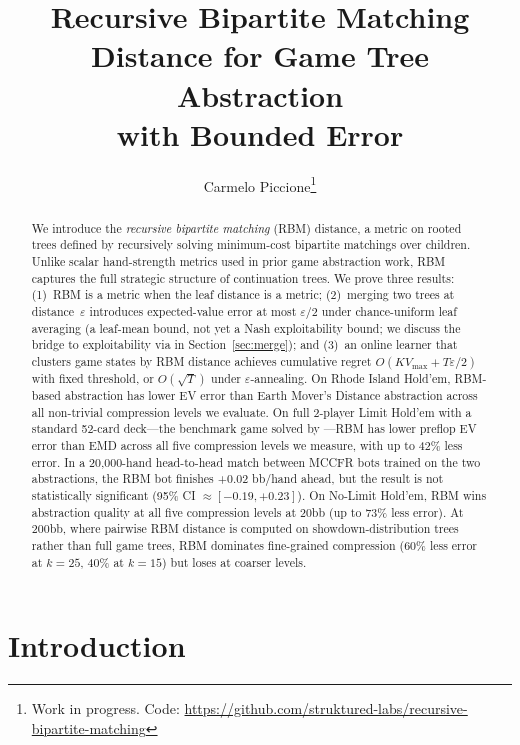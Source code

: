 \documentclass[11pt]{article}
\title{Recursive Bipartite Matching Distance for Game Tree Abstraction\\with Bounded Error}
\author{
  Carmelo Piccione\thanks{Work in progress. Code: \url{https://github.com/struktured-labs/recursive-bipartite-matching}}
}
\date{}
\begin{document}
\maketitle

\begin{abstract}
We introduce the \emph{recursive bipartite matching} (RBM) distance, a
metric on rooted trees defined by recursively solving minimum-cost
bipartite matchings over children. Unlike scalar hand-strength metrics
used in prior game abstraction work, RBM captures the full strategic
structure of continuation trees. We prove three results: (1)~RBM is a
metric when the leaf distance is a metric; (2)~merging two trees at
distance~$\varepsilon$ introduces expected-value error at most
$\varepsilon/2$ under chance-uniform leaf averaging (a leaf-mean
bound, not yet a Nash exploitability bound; we discuss the bridge to
exploitability via \citet{kroer2014extensive,kroer2018unified} in
Section~\ref{sec:merge}); and (3)~an online learner that clusters game
states by RBM distance achieves cumulative regret
$O(K V_{\max} + T\varepsilon/2)$ with fixed threshold, or $O(\sqrt{T})$
under $\varepsilon$-annealing. On Rhode Island Hold'em, RBM-based
abstraction has lower EV error than Earth Mover's Distance abstraction
across all non-trivial compression levels we evaluate. On full
2-player Limit Hold'em with a standard 52-card deck---the benchmark
game solved by \citet{bowling2015solving}---RBM has lower preflop EV
error than EMD across all five compression levels we measure, with up
to 42\% less error. In a 20{,}000-hand head-to-head match between
MCCFR bots trained on the two abstractions, the RBM bot finishes
+0.02 bb/hand ahead, but the result is not statistically significant
(95\% CI $\approx [-0.19, +0.23]$). On No-Limit Hold'em, RBM wins
abstraction quality at all five compression levels at 20bb (up to 73\%
less error). At 200bb, where pairwise RBM distance is computed on
showdown-distribution trees rather than full game trees, RBM dominates
fine-grained compression (60\% less error at $k{=}25$, 40\% at
$k{=}15$) but loses at coarser levels.
\end{abstract}

\section{Introduction}
\label{sec:intro}
\end{document}
